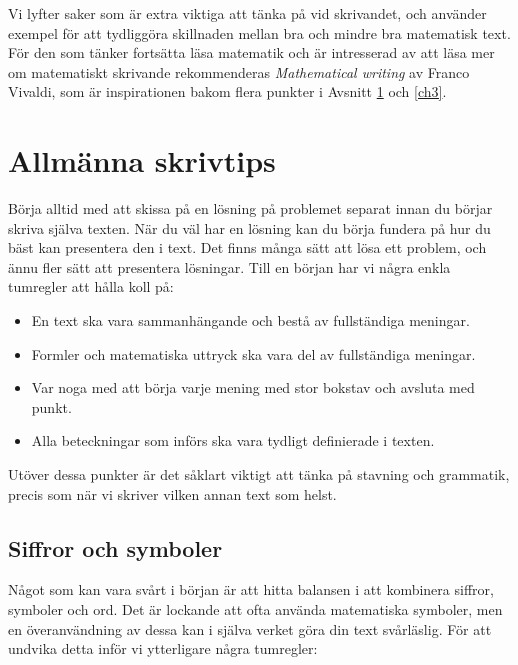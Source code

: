 \documentclass[titlepage]{article}
\begin{document}
Vi lyfter saker som är extra viktiga att tänka på vid skrivandet, och använder exempel för att tydliggöra skillnaden mellan bra och mindre bra matematisk text. För den som tänker fortsätta läsa matematik och är intresserad av att läsa mer om matematiskt skrivande rekommenderas \textit{Mathematical writing} av Franco Vivaldi\cite{vivaldi}, som är inspirationen bakom flera punkter i Avsnitt \ref{ch2} och \ref{ch3}.



\section{Allmänna skrivtips}\label{ch2}

Börja alltid med att skissa på en lösning på problemet separat innan du börjar skriva själva texten. När du väl har en lösning kan du börja fundera på hur du bäst kan presentera den i text. Det finns många sätt att lösa ett problem, och ännu fler sätt att presentera lösningar. Till en början har vi några enkla tumregler att hålla koll på:

\begin{itemize}
    \item En text ska vara sammanhängande och bestå av fullständiga meningar.
    \item Formler och matematiska uttryck ska vara del av fullständiga meningar.
    \item Var noga med att börja varje mening med stor bokstav och avsluta med punkt.
    \item Alla beteckningar som införs ska vara tydligt definierade i texten.
\end{itemize}

Utöver dessa punkter är det såklart viktigt att tänka på stavning och grammatik, precis som när vi skriver vilken annan text som helst.




\subsection{Siffror och symboler}

Något som kan vara svårt i början är att hitta balansen i att kombinera siffror, symboler och ord. Det är lockande att ofta använda matematiska symboler, men en överanvändning av dessa kan i själva verket göra din text svårläslig. För att undvika detta inför vi ytterligare några tumregler:
\end{document}
